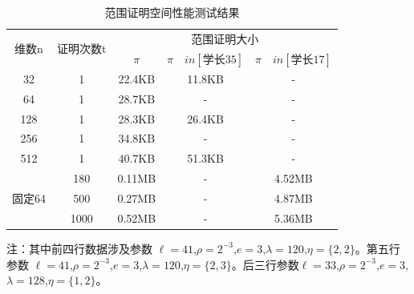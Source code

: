 \documentclass[zihao=-4]{ctexart}
\begin{document}
\begin{table}[!h] %
    \centering
    \caption{范围证明空间性能测试结果}
    \begin{threeparttable}
        \begin{tabular}{|c|c|c|c|c|}\hline
            \multirow{2}{*}{维数n} & \multirow{2}{*}{证明次数t}&\multicolumn{3}{c|}{范围证明大小}  \\ \cline{3-5}
            \multirow{2}{*}{} & \multirow{2}{*}{}& $\pi$ & $\pi \quad in [学长35]$ & $\pi \quad in [学长17]$\\ \hline
            32 & 1 & 22.4KB & 11.8KB & -\\ \hline
             64 & 1 & 28.7KB & - & -\\ \hline
            128 & 1 & 28.3KB & 26.4KB & -\\ \hline
             256 & 1 & 34.8KB & - & -\\ \hline
             512 & 1 & 40.7KB & 51.3KB & -\\ \hline
            \multirow{3}{*}{固定64} & 180 & 0.11MB & - & 4.52MB \\ \cline{2-5}
            \multirow{3}{*}{} & 500 & 0.27MB & - & 4.87MB \\ \cline{2-5}
             \multirow{3}{*}{} & 1000 & 0.52MB & - & 5.36MB \\ \cline{1-5}
        \end{tabular}
        注：其中前四行数据涉及参数               $\ell=41$,$\rho=2^{-3}$,$e=3$,$\lambda=120$,$\eta=\{2,2\}$。第五行参数
         $\ell=41$,$\rho=2^{-3}$,$e=3$,$\lambda=120$,$\eta=\{2,3\}$。后三行参数$\ell=33$,$\rho=2^{-3}$,$e=3$,$\lambda=128$,$\eta=\{1,2\}$。
    \end{threeparttable}
    \label{空间性能}
\end{table}
\end{document}
